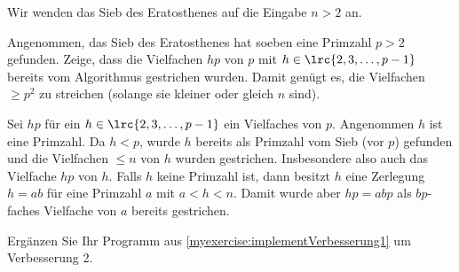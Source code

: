 \begin{mychallenge}[Verbesserung 2]\label{myexercise:Verbesserung2}
	Wir wenden das Sieb des Eratosthenes auf die Eingabe $n>2$ an.

	Angenommen, das Sieb des Eratosthenes hat soeben eine Primzahl $p > 2$ gefunden. Zeige, dass die Vielfachen $hp$ von $p$ mit $h\in\lrc{2,3, \ldots , p-1}$ bereits vom Algorithmus gestrichen wurden. Damit genügt es, die Vielfachen $\geq p^2$ zu streichen (solange sie kleiner oder gleich $n$ sind).
	\begin{myanswer}
		Sei $hp$ für ein $h\in\lrc{2,3, \ldots , p-1}$ ein Vielfaches von $p$. Angenommen $h$ ist eine Primzahl. Da $h<p$, wurde $h$ bereits als Primzahl vom Sieb (vor $p$) gefunden und die Vielfachen $\leq n$ von $h$ wurden gestrichen. Insbesondere also auch das Vielfache $hp$ von $h$. Falls $h$ keine Primzahl ist, dann besitzt $h$ eine Zerlegung $h = ab$ für eine Primzahl $a$ mit $a<h<n$. Damit wurde aber $hp = abp$ als $bp$-faches Vielfache von $a$ bereits gestrichen.
	\end{myanswer}
\end{mychallenge}


\begin{mychallenge}\label{myexercise:implementVerbesserung2}
	Ergänzen Sie Ihr Programm aus \cref{myexercise:implementVerbesserung1} um Verbesserung 2.
	\begin{myanswer}
		
	\end{myanswer}
\end{mychallenge}


